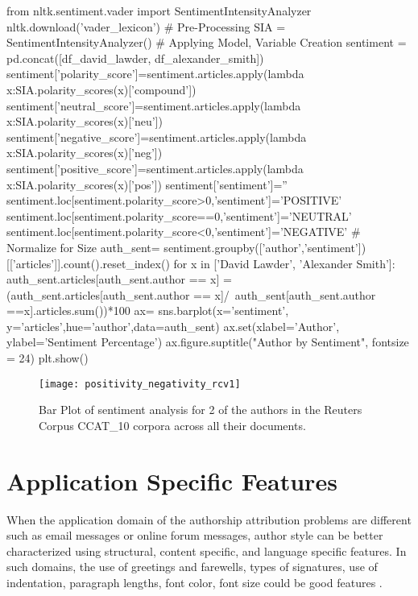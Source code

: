 \begin{lstlisting}[frame=none,caption={Compute sentence Positivity and Negativity scores.},captionpos=b,label=lst:posnegRCV1CCAT10]
\end{lstlisting}
\begin{python}	
	from nltk.sentiment.vader import SentimentIntensityAnalyzer
	nltk.download('vader_lexicon')
	# Pre-Processing
	SIA = SentimentIntensityAnalyzer()
	# Applying Model, Variable Creation
	sentiment = pd.concat([df_david_lawder, df_alexander_smith])
	sentiment['polarity_score']=sentiment.articles.apply(lambda x:SIA.polarity_scores(x)['compound'])
	sentiment['neutral_score']=sentiment.articles.apply(lambda x:SIA.polarity_scores(x)['neu'])
	sentiment['negative_score']=sentiment.articles.apply(lambda x:SIA.polarity_scores(x)['neg'])
	sentiment['positive_score']=sentiment.articles.apply(lambda x:SIA.polarity_scores(x)['pos'])
	sentiment['sentiment']=''
	sentiment.loc[sentiment.polarity_score>0,'sentiment']='POSITIVE'
	sentiment.loc[sentiment.polarity_score==0,'sentiment']='NEUTRAL'
	sentiment.loc[sentiment.polarity_score<0,'sentiment']='NEGATIVE'
	# Normalize for Size
	auth_sent= sentiment.groupby(['author','sentiment'])[['articles']].count().reset_index()
	for x in ['David Lawder', 'Alexander Smith']:
	auth_sent.articles[auth_sent.author == x] = (auth_sent.articles[auth_sent.author == x]/\
	auth_sent[auth_sent.author ==x].articles.sum())*100
	ax= sns.barplot(x='sentiment', y='articles',hue='author',data=auth_sent)
	ax.set(xlabel='Author', ylabel='Sentiment Percentage')
	ax.figure.suptitle("Author by Sentiment", fontsize = 24)
	plt.show()
\end{python}

\begin{figure}[ht]
	\centering
	\texttt{[image: positivity\_negativity\_rcv1]}
	\caption[Positivity and Negativity scores for Reuters Corpus authors]{Bar Plot of sentiment analysis for 2 of the authors in the Reuters Corpus CCAT\_10 corpora across all their documents.}
	\label{fig:rcv1_ccat10_sentiment_analysis}
\end{figure}

\section{Application Specific Features}

When the application domain of the authorship attribution problems are different
such as email messages or online forum messages, author style can be better characterized using structural, content specific, and language specific features. In such
domains, the use of greetings and farewells, types of signatures, use of indentation,
paragraph lengths, font color, font size could be good features \cite{stamatatos2009survey}.

